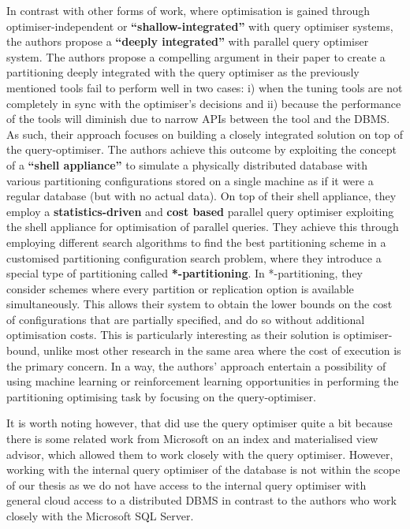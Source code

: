 In contrast with other forms of work, where optimisation is gained through optimiser-independent  or \textbf{“shallow-integrated”} with query optimiser systems, the authors propose a \textbf{“deeply integrated”} with parallel query optimiser system. The authors propose a compelling argument in their paper to create a partitioning deeply integrated with the query optimiser as the previously mentioned tools fail to perform well in two cases: i) when the tuning tools are not completely in sync with the optimiser’s decisions and ii) because the performance of the tools will diminish due to narrow APIs between the tool and the DBMS. As such, their approach focuses on building a closely integrated solution on top of the query-optimiser. The authors achieve this outcome by exploiting the concept of a \textbf{“shell appliance”} to simulate a physically distributed database with various partitioning configurations stored on a single machine as if it were a regular database (but with no actual data). On top of their shell appliance, they employ a \textbf{statistics-driven} and \textbf{cost based} parallel query optimiser exploiting the shell appliance for optimisation of parallel queries. They achieve this through employing different search algorithms to find the best partitioning scheme in a customised partitioning configuration search problem, where they introduce a special type of partitioning called \textbf{*-partitioning}. In *-partitioning, they consider schemes where every partition or replication option is available simultaneously. This allows their system to obtain the lower bounds on the cost of configurations that are partially specified, and do so without additional optimisation costs. This is particularly interesting as their solution is optimiser-bound, unlike most other research in the same area where the cost of execution is the primary concern. In a way, the authors’ approach entertain a possibility of using machine learning or reinforcement learning opportunities in performing the partitioning optimising task by focusing on the query-optimiser.

It is worth noting however, that \citeauthor{DBLP:conf/sigmod/NehmeB11} did use the query optimiser quite a bit because there is some related work from Microsoft on an index and materialised view advisor, which allowed them to work closely with the query optimiser. However, working with the internal query optimiser of the database is not within the scope of our thesis as we do not have access to the internal query optimiser with general cloud access to a distributed DBMS in contrast to the authors who work closely with the Microsoft SQL Server.

